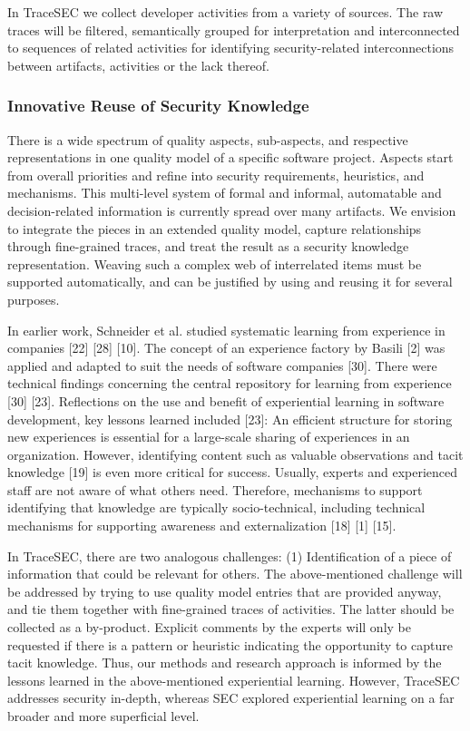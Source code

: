 In TraceSEC we collect developer activities from a variety of sources. The raw traces will be filtered, semantically grouped for interpretation and interconnected to sequences of related activities for identifying security-related interconnections between artifacts, activities or the lack thereof.

\vspace{-0.5em}
\subsubsection*{Innovative Reuse of Security Knowledge}
\vspace{-1em}
There is a wide spectrum of quality aspects, sub-aspects, and respective representations in one quality model of a specific software project. Aspects start from overall priorities and refine into security requirements, heuristics, and mechanisms. This multi-level system of formal and informal, automatable and decision-related information is currently spread over many artifacts. We envision to integrate the pieces in an extended quality model, capture relationships through fine-grained traces, and treat the result as a security knowledge representation. Weaving such a complex web of interrelated items must be supported automatically, and can be justified by using and reusing it for several purposes.

In earlier work, Schneider et al. studied systematic learning from experience in companies [22] [28] [10]. The concept of an experience factory by Basili [2] was applied and adapted to suit the needs of software companies [30]. There were technical findings concerning the central repository for learning from experience [30] [23]. Reflections on the use and benefit of experiential learning in software development, key lessons learned included [23]: An efficient structure for storing new experiences is essential for a large-scale sharing of experiences in an organization. However, identifying content such as valuable observations and tacit knowledge [19] is even more critical for success. Usually, experts and experienced staff are not aware of what others need. Therefore, mechanisms to support identifying that knowledge are typically socio-technical, including technical mechanisms for supporting awareness and externalization [18] [1] [15]. 

In TraceSEC, there are two analogous challenges: (1) Identification of a piece of information that could be relevant for others. The above-mentioned challenge will be addressed by trying to use quality model entries that are provided anyway, and tie them together with fine-grained traces of activities. The latter should be collected as a by-product. Explicit comments by the experts will only be requested if there is a pattern or heuristic indicating the opportunity to capture tacit knowledge. Thus, our methods and research approach is informed by the lessons learned in the above-mentioned experiential learning. However, TraceSEC addresses security in-depth, whereas SEC explored experiential learning on a far broader and more superficial level.

